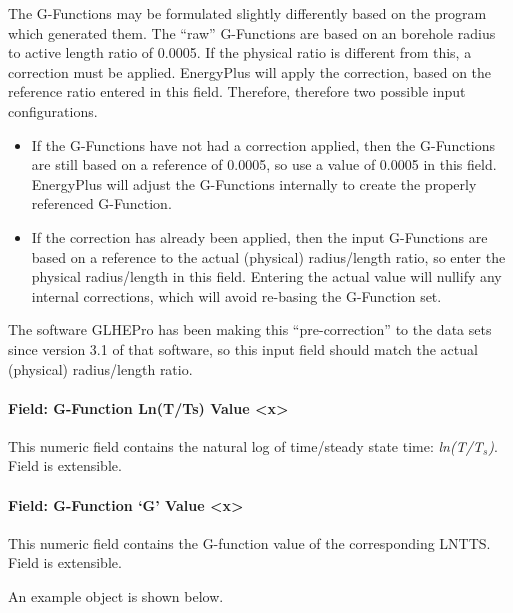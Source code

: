 The G-Functions may be formulated slightly differently based on the program which generated them. The ``raw'' G-Functions are based on an borehole radius to active length ratio of 0.0005. If the physical ratio is different from this, a correction must be applied. EnergyPlus will apply the correction, based on the reference ratio entered in this field. Therefore, therefore two possible input configurations.

\begin{itemize}
\item
  If the G-Functions have not had a correction applied, then the G-Functions are still based on a reference of 0.0005, so use a value of 0.0005 in this field. EnergyPlus will adjust the G-Functions internally to create the properly referenced G-Function.
\item
  If the correction has already been applied, then the input G-Functions are based on a reference to the actual (physical) radius/length ratio, so enter the physical radius/length in this field. Entering the actual value will nullify any internal corrections, which will avoid re-basing the G-Function set.
\end{itemize}

The software GLHEPro has been making this ``pre-correction'' to the data sets since version 3.1 of that software, so this input field should match the actual (physical) radius/length ratio.

\paragraph{Field: G-Function Ln(T/Ts) Value \textless{}x\textgreater{}}\label{field-g-function-lntts-value-x}

This numeric field contains the natural log of time/steady state time: \emph{ln(T/T\(_{s}\))}. Field is extensible.

\paragraph{Field: G-Function `G' Value \textless{}x\textgreater{}}\label{field-g-function-g-value-x}

This numeric field contains the G-function value of the corresponding LNTTS. Field is extensible.

An example object is shown below.

